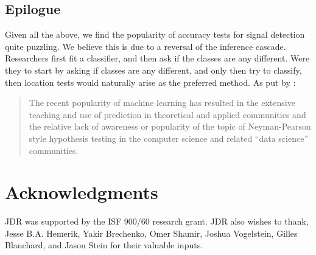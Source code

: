 \documentclass[12pt,a4paper]{article}
\begin{document}
\subsection{Epilogue}
Given all the above, we find the popularity of accuracy tests for signal detection quite puzzling. 
We believe this is due to a reversal of the inference cascade. 
Researchers first fit a classifier, and then ask if the classes are any different.
Were they to start by asking if classes are any different, and only then try to classify, then location tests would naturally arise as the preferred method. 
As put by \cite{ramdas_classification_2016}:
\begin{quote}
The recent popularity of machine learning has resulted in the extensive teaching and use
of prediction in theoretical and applied communities and the relative lack of awareness or
popularity of the topic of Neyman-Pearson style hypothesis testing in the computer science
and related ``data science'' communities.
\end{quote}






\section{Acknowledgments}
JDR was supported by the ISF 900/60 research grant. 
JDR also wishes to thank, Jesse B.A. Hemerik, Yakir Brechenko, Omer Shamir, Joshua Vogelstein, Gilles Blanchard, and Jason Stein for their valuable inputs. 




\newpage


\end{document}
